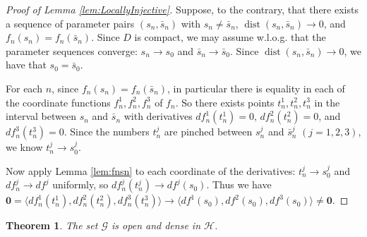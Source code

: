 \documentclass[12pt]{article}
\numberwithin{equation}{subsection}
\newtheorem{thm}{Theorem}
\theoremstyle{definition}
\numberwithin{lem}{section}
\def\bs{\bar{s}}
\def\G{\mathcal{G}}
\def\H{\mathcal{H}}
\begin{document}
\begin{proof}[Proof of Lemma \ref{lem:LocallyInjective}]

Suppose, to the contrary, that there exists a sequence of parameter pairs $(s_n, \bs_n)$ with $s_n \neq \bs_n$, $\mathop{dist}(s_n, \bs_n) \to 0$, and $f_n(s_n)=f_n(\bs_n)$. Since $D$ is compact, we may assume w.l.o.g. that the parameter sequences converge: $s_n \to s_0$ and $\bs_n \to \bs_0$. Since $\mathop{dist}(s_n, \bs_n) \to 0$, we have that $s_0=\bs_0$.

For each $n$,  since $f_n(s_n)=f_n(\bs_n)$, in particular there is equality in each of the coordinate functions $f_n^1, f_n^2, f_n^3$  of $f_n$. So there exists points $t_n^1, t_n^2, t_n^3$ in the interval between $s_n$ and $\bs_n$ with derivatives
$df_n^1(t_n^1)=0$, $df_n^2(t_n^2)=0$, and $df_n^3(t_n^3)=0$. Since the numbers $t_n^j$ are pinched  between $s_n^j$ and $\bs_n^j$ $(j=1,2,3) $, we know $t_n^j \to s_0^j$.  

Now apply Lemma \ref{lem:fnsn} to each coordinate of the derivatives: 
$t_n^j \to s_0^j$ and $df_n^j \to df^j$ uniformly, so $df_n^j(t_n^j) \to df^j(s_0)$.  Thus we have $\mathbf{0} =\langle df_n^1(t_n^1), df_n^2(t_n^2), df_n^3(t_n^3)\rangle \to \langle df^1(s_0), df^2(s_0), df^3(s_0) \rangle \neq \mathbf{0}$.
\end{proof}


\begin{thm}
The set $\G$ is open and dense in $\H$. \label{generic}
\end{thm}
\end{document}
